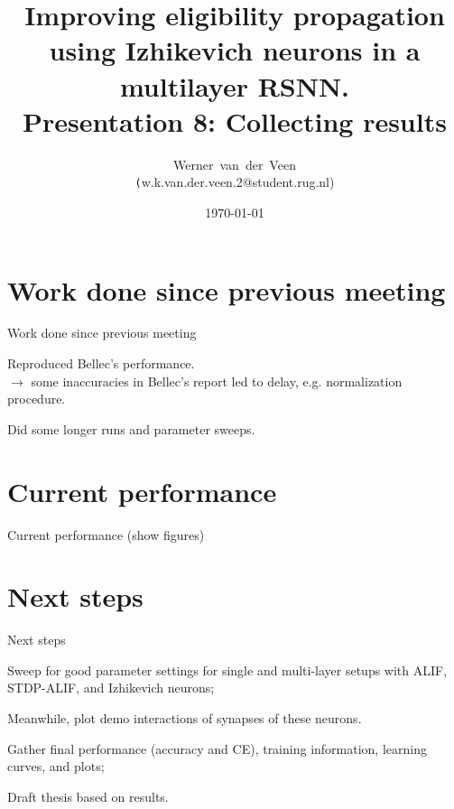 \documentclass[t]{beamer}
\title[Eligibility propagation]{Improving eligibility propagation using Izhikevich neurons in a multilayer RSNN.\\\vspace{10pt}
\large{Presentation 8: Collecting results}}
\author[Werner]{Werner~van~der~Veen\\\footnotesize\texttt({w.k.van.der.veen.2@student.rug.nl})}\date{\today}
\newcommand{\cmark}{\ding{51}}%
\newcommand{\done}{\rlap{$\square$}{\raisebox{2pt}{\large\hspace{1pt}\cmark}}%
\hspace{-2.5pt}}
\begin{document}
\begin{frame}
    \titlepage
\end{frame}



\small

\section{Work done since previous meeting}
\begin{frame}{Work done since previous meeting}
  \begin{todolist}

    \item[\done] Reproduced Bellec's performance.\\
    $\rightarrow$ some inaccuracies in Bellec's report led to delay, e.g. normalization procedure.
    \item[\done] Did some longer runs and parameter sweeps.

  \end{todolist}

\end{frame}

\section{Current performance}
\begin{frame}{Current performance}
  (show figures)
\end{frame}

\section{Next steps}
\begin{frame}{Next steps}
  \begin{todolist}

    \item Sweep for good parameter settings for single and multi-layer setups with ALIF, STDP-ALIF, and Izhikevich neurons;
    \item Meanwhile, plot demo interactions of synapses of these neurons.
    \item Gather final performance (accuracy and CE), training information, learning curves, and plots;
    \item Draft thesis based on results.

  \end{todolist}
\end{frame}
\end{document}
